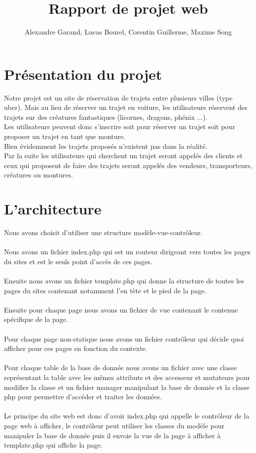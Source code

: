 \documentclass{article}
\title{Rapport de projet web}
\author{Alexandre Garand, Lucas Bourel, Corentin Guillerme, Maxime Song}
\begin{document}
\maketitle
\setcounter{tocdepth}{2}
\tableofcontents
\newpage

\section{Présentation du projet}
    Notre projet est un site de réservation de trajets entre plusieurs villes (type uber). Mais au lieu de réserver un trajet en voiture, les utilisateurs réservent des trajets sur des créatures fantastiques (licornes, dragons, phénix ...).
    \\
    
    Les utilisateurs peuvent donc s'inscrire soit pour réserver un trajet soit pour proposer un trajet en tant que monture.
    \\
    
    Bien évidemment les trajets proposés n'existent pas dans la réalité.
    \\
    
    Par la suite les utilisateurs qui cherchent un trajet seront appelés des clients et ceux qui proposent de faire des trajets seront appelés des vendeurs, transporteurs, créatures ou montures.

\section{L'architecture}
	Nous avons choisit d'utiliser une structure modèle-vue-contrôleur.\\ \\
	Nous avons un fichier index.php qui est un routeur dirigeant vers toutes les pages du sites et est le seuls point d’accès de ces pages.\\ \\
	Ensuite nous avons un fichier template.php qui donne la structure de toutes les pages du sites contenant notamment l'en tète et le pied de la page.\\ \\
	Ensuite pour chaque page nous avons un fichier de vue contenant le contenue spécifique de la page.\\ \\
	Pour chaque page non-statique nous avons un fichier contrôleur qui décide quoi afficher pour ces pages en fonction du contexte.\\ \\
	Pour chaque table de la base de donnée nous avons un fichier avec une classe représentant la table avec les mêmes attributs et des accesseur et mutateurs pour modifier la classe et un fichier manager manipulant la base de donnée et la classe php pour permettre d'accéder et traiter les données.\\ \\
	Le principe du site web est donc d'avoir index.php qui appelle le contrôleur de la page web à afficher, le contrôleur peut utiliser les classes du modèle pour manipuler la base de donnée puis il envoie la vue de la page à afficher à template.php qui affiche la page.
\end{document}
